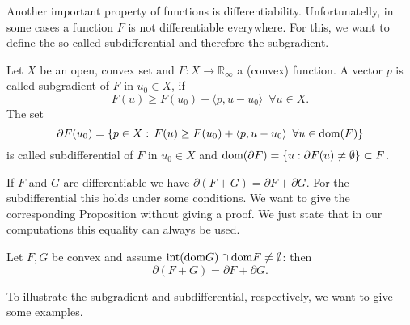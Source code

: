     Another important property of functions is differentiability. Unfortunatelly, in some cases a function $F$ is not differentiable everywhere. For this, we want to define the so called subdifferential and therefore the subgradient.

    \begin{definition} %
        \label{def:subgradient_subdifferential}

        Let $X$ be an open, convex set and $F: X \longrightarrow \mathbb{R}_{\infty}$ a (convex) function. A vector $p$ is called subgradient of $F$ in $u_{0} \in X$, if
            \begin{equation}
                F(u) \ge F(u_{0}) + \langle p, u - u_{0} \rangle \,\,\, \forall u \in X. \label{eq:subgradient}
            \end{equation}
        The set
            \begin{equation}
                \partial F(u_{0}) = \{ p \in X: \, F(u) \ge F(u_{0}) + \langle p, u - u_{0} \rangle \,\,\, \forall u \in \textnormal{dom}(F) \}
            \end{equation}
        is called subdifferential of $F$ in $u_{0} \in X$ and $\textnormal{dom}(\partial F) = \{ u: \partial F(u) \ne \emptyset \} \subset F$.

    \end{definition}

    If $F$ and $G$ are differentiable we have $\partial(F + G) = \partial F + \partial G$. For the subdifferential this holds under some conditions. We want to give the corresponding Proposition without giving a proof. We just state that in our computations this equality can always be used.

    \begin{proposition} %

        Let $F, G$ be convex and assume $\textnormal{int} (\textnormal{dom} G) \cap \textnormal{dom} F \ne \emptyset$: then
            $$
                \partial(F + G) = \partial F + \partial G.
            $$
    
    \end{proposition}

    To illustrate the subgradient and subdifferential, respectively, we want to give some examples.

